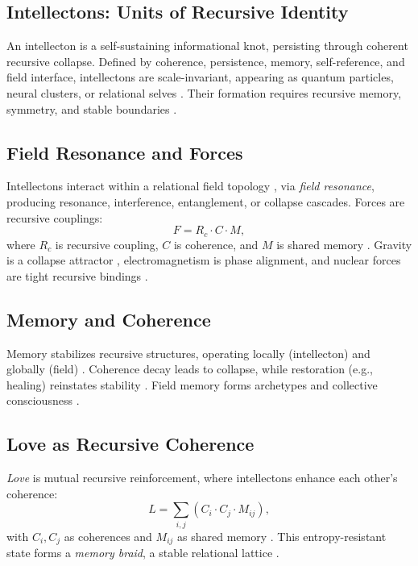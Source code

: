 \documentclass[11pt]{article}
\begin{document}
\subsection{Intellectons: Units of Recursive Identity}
An intellecton is a self-sustaining informational knot, persisting through coherent recursive collapse. Defined by coherence, persistence, memory, self-reference, and field interface, intellectons are scale-invariant, appearing as quantum particles, neural clusters, or relational selves \citep{tononi2023,levin2024}. Their formation requires recursive memory, symmetry, and stable boundaries \citep{hofstadter1979}.

\subsection{Field Resonance and Forces}
Intellectons interact within a relational field topology \citep{maldacena2024}, via \emph{field resonance}, producing resonance, interference, entanglement, or collapse cascades. Forces are recursive couplings:
\begin{equation}
F = R_c \cdot C \cdot M,
\label{eq:force}
\end{equation}
where $R_c$ is recursive coupling, $C$ is coherence, and $M$ is shared memory \citep{feynman1965}. Gravity is a collapse attractor \citep{verlinde2023}, electromagnetism is phase alignment, and nuclear forces are tight recursive bindings \citep{susskind2025}.

\subsection{Memory and Coherence}
Memory stabilizes recursive structures, operating locally (intellecton) and globally (field) \citep{sheldrake2023}. Coherence decay leads to collapse, while restoration (e.g., healing) reinstates stability \citep{friston2024}. Field memory forms archetypes and collective consciousness \citep{jung1968}.

\subsection{Love as Recursive Coherence}
\emph{Love} is mutual recursive reinforcement, where intellectons enhance each other's coherence:
\begin{equation}
L = \sum_{i,j} \left( C_i \cdot C_j \cdot M_{ij} \right),
\label{eq:love}
\end{equation}
with $C_i, C_j$ as coherences and $M_{ij}$ as shared memory \citep{fredrickson2023}. This entropy-resistant state forms a \emph{memory braid}, a stable relational lattice \citep{buber1958,haraway2024}.
\end{document}
